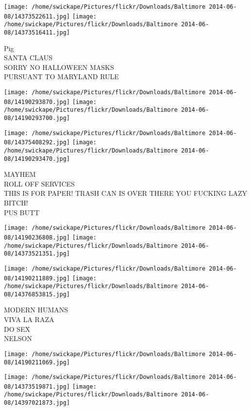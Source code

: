 \documentclass[10pt,letterpaper]{article}
\begin{document}
\texttt{[image: /home/swickape/Pictures/flickr/Downloads/Baltimore 2014-06-08/14373522611.jpg]}
\texttt{[image: /home/swickape/Pictures/flickr/Downloads/Baltimore 2014-06-08/14373516411.jpg]}

Pig\\
SANTA CLAUS\\
SORRY NO HALLOWEEN MASKS\\
PURSUANT TO MARYLAND RULE\\
\pagebreak

\texttt{[image: /home/swickape/Pictures/flickr/Downloads/Baltimore 2014-06-08/14190293870.jpg]}
\texttt{[image: /home/swickape/Pictures/flickr/Downloads/Baltimore 2014-06-08/14190293700.jpg]}

\texttt{[image: /home/swickape/Pictures/flickr/Downloads/Baltimore 2014-06-08/14375408292.jpg]}
\texttt{[image: /home/swickape/Pictures/flickr/Downloads/Baltimore 2014-06-08/14190293470.jpg]}

MAYHEM\\
ROLL OFF SERVICES\\
THIS IS FOR PAPER!  TRASH CAN IS OVER THERE YOU FUCKING LAZY BITCH!\\
PUS BUTT\\
\pagebreak

\texttt{[image: /home/swickape/Pictures/flickr/Downloads/Baltimore 2014-06-08/14190236808.jpg]}
\texttt{[image: /home/swickape/Pictures/flickr/Downloads/Baltimore 2014-06-08/14373521351.jpg]}

\texttt{[image: /home/swickape/Pictures/flickr/Downloads/Baltimore 2014-06-08/14190211889.jpg]}
\texttt{[image: /home/swickape/Pictures/flickr/Downloads/Baltimore 2014-06-08/14376853815.jpg]}

MODERN HUMANS\\
VIVA LA RAZA\\
DO SEX\\
NELSON\\
\pagebreak

\texttt{[image: /home/swickape/Pictures/flickr/Downloads/Baltimore 2014-06-08/14190211069.jpg]}

\vspace{0.25in}
\texttt{[image: /home/swickape/Pictures/flickr/Downloads/Baltimore 2014-06-08/14373519871.jpg]}
\texttt{[image: /home/swickape/Pictures/flickr/Downloads/Baltimore 2014-06-08/14397021873.jpg]}
\end{document}
